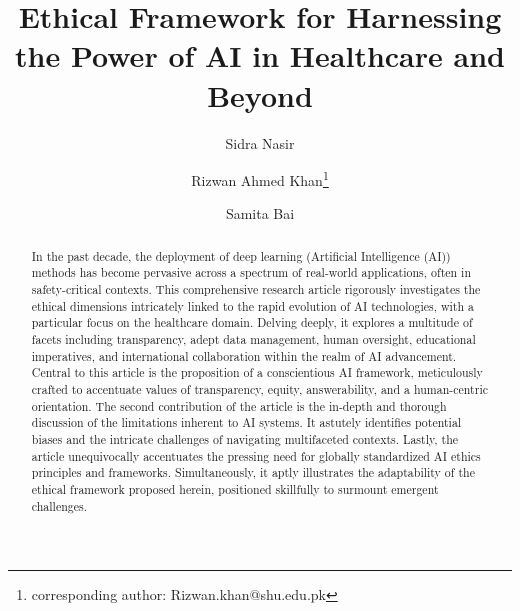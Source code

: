 \documentclass{article}
\date{}
\title{Ethical Framework for Harnessing the Power of AI in Healthcare and Beyond}
\author{Sidra Nasir}
\author{Rizwan Ahmed Khan\thanks{corresponding author: Rizwan.khan@shu.edu.pk}}
\author{Samita Bai}
\affil{Department of Computer Science, Faculty of Information Technology, Salim Habib University, Karachi, Pakistan}
\begin{document}
\maketitle

\begin{abstract}
In the past decade, the deployment of deep learning (Artificial Intelligence (AI)) methods has become pervasive across a spectrum of real-world applications, often in safety-critical contexts. This comprehensive research article rigorously investigates the ethical dimensions intricately linked to the rapid evolution of AI technologies, with a particular focus on the healthcare domain. Delving deeply, it explores a multitude of facets including transparency, adept data management, human oversight, educational imperatives, and international collaboration within the realm of AI advancement. Central to this article is the proposition of a conscientious AI framework, meticulously crafted to accentuate values of transparency, equity, answerability, and a human-centric orientation. The second contribution of the article is the in-depth and thorough discussion of the limitations inherent to AI systems. It astutely identifies potential biases and the intricate challenges of navigating multifaceted contexts. Lastly, the article unequivocally accentuates the pressing need for globally standardized AI ethics principles and frameworks. Simultaneously, it aptly illustrates the adaptability of the ethical framework proposed herein, positioned skillfully to surmount emergent challenges.










\end{abstract}
\end{document}

